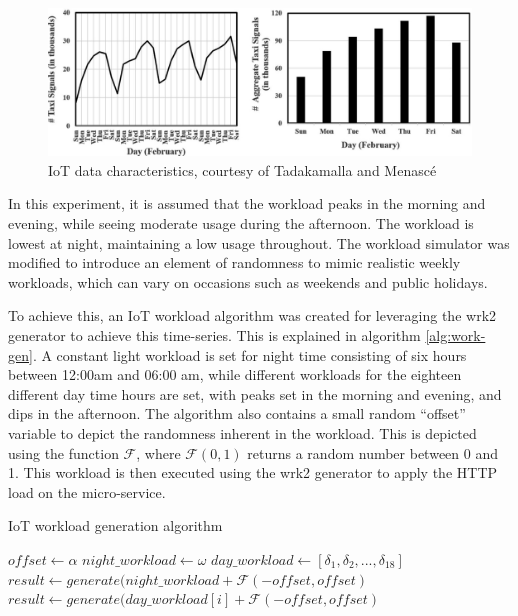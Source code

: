 \begin{figure}[htb]
    \centering
    \caption{IoT data characteristics, courtesy of Tadakamalla and Menasc{\'e} \cite{tadakamalla2019characterization}}
    \label{fig:iot-workload-characteristics}
    \includegraphics[width=1.0\linewidth]{Figures/IoT-Workload-Characteristics.pdf}
\end{figure}

In this experiment, it is assumed that the workload peaks in the morning and evening, while seeing moderate usage during the afternoon. The workload is lowest at night, maintaining a low usage throughout. The workload simulator was modified to introduce an element of randomness to mimic realistic weekly workloads, which can vary on occasions such as weekends and public holidays.\par

To achieve this, an IoT workload algorithm was created for leveraging the wrk2 generator to achieve this time-series. This is explained in algorithm \ref{alg:work-gen}. A constant light workload is set for night time consisting of six hours between 12:00am and 06:00 am, while different workloads for the eighteen different day time hours are set, with peaks set in the morning and evening, and dips in the afternoon. The algorithm also contains a small random ``offset'' variable to depict the randomness inherent in the workload. This is depicted using the function $\mathcal{F}$, where $\mathcal{F}(0,1)$ returns a random number between 0 and 1. This workload is then executed using the wrk2 generator to apply the HTTP load on the micro-service.

\begin{algorithm}
    \caption{IoT workload generation algorithm}
    \label{alg:work-gen}
    \begin{algorithmic}
        \State $offset \gets \alpha$
        \State $night\_workload \gets \omega$
        \State $day\_workload \gets [ \delta_1, \delta_2, ... , \delta_{18}]$
                \State $result \gets generate(night\_workload + \mathcal{F}(-offset,offset)$
            \EndFor
                \State $result \gets generate(day\_workload[i] + \mathcal{F}(-offset,offset)$
            \EndFor
        \EndWhile
    \end{algorithmic}
\end{algorithm}

